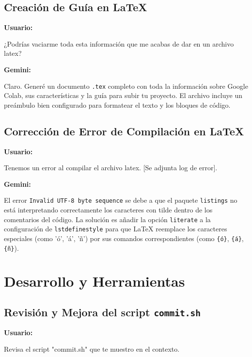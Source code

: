 \documentclass[12pt, a4paper]{article}
\newenvironment{usuario}{\par\noindent\textbf{Usuario:}\itshape\par\ignorespaces}{\par}
\newenvironment{gemini}{\par\noindent\textbf{Gemini:}\par\ignorespaces}{\par}
\begin{document}
\subsection{Creación de Guía en LaTeX}

\begin{usuario}
¿Podrías vaciarme toda esta información que me acabas 
de dar en un archivo latex?
\end{usuario}

\begin{gemini}
Claro. Generé un documento \texttt{.tex} completo con toda la información sobre Google Colab, sus características y la guía 
para subir tu proyecto. El archivo incluye un preámbulo bien configurado para formatear el texto y los bloques de código.
\end{gemini}

\subsection{Corrección de Error de Compilación en LaTeX}

\begin{usuario}
Tenemos un error al compilar el archivo latex. [Se adjunta log 
de error].
\end{usuario}

\begin{gemini}
El error \texttt{Invalid UTF-8 byte sequence} se debe a que el 
paquete \texttt{listings} no está interpretando correctamente 
los caracteres con tilde dentro de los comentarios del código. 
La solución es añadir la opción \texttt{literate} a la 
configuración de \texttt{lstdefinestyle} para que LaTeX 
reemplace los caracteres especiales (como 'ó', 'á', 'ñ') por 
sus comandos correspondientes 
(como \texttt{\{\'o\}}, \texttt{\{\'a\}}, \texttt{\{\~n\}}).
\end{gemini}

\section{Desarrollo y Herramientas}

\subsection{Revisión y Mejora del script \texttt{commit.sh}}

\begin{usuario}
Revisa el script "commit.sh" que te muestro en el contexto.
\end{usuario}
\end{document}
